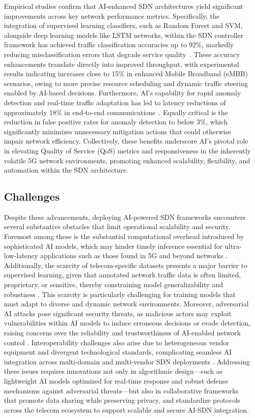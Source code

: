 \documentclass[sigconf]{acmart}
\begin{document}
Empirical studies confirm that AI-enhanced SDN architectures yield significant improvements across key network performance metrics. Specifically, the integration of supervised learning classifiers, such as Random Forest and SVM, alongside deep learning models like LSTM networks, within the SDN controller framework has achieved traffic classification accuracies up to 92\%, markedly reducing misclassification errors that degrade service quality~\cite{ref52}. These accuracy enhancements translate directly into improved throughput, with experimental results indicating increases close to 15\% in enhanced Mobile Broadband (eMBB) scenarios, owing to more precise resource scheduling and dynamic traffic steering enabled by AI-based decisions. Furthermore, AI’s capability for rapid anomaly detection and real-time traffic adaptation has led to latency reductions of approximately 18\% in end-to-end communications~\cite{ref52}. Equally critical is the reduction in false positive rates for anomaly detection to below 3\%, which significantly minimizes unnecessary mitigation actions that could otherwise impair network efficiency. Collectively, these benefits underscore AI’s pivotal role in elevating Quality of Service (QoS) metrics and responsiveness in the inherently volatile 5G network environments, promoting enhanced scalability, flexibility, and automation within the SDN architecture.

\subsection{Challenges}

Despite these advancements, deploying AI-powered SDN frameworks encounters several substantive obstacles that limit operational scalability and security. Foremost among these is the substantial computational overhead introduced by sophisticated AI models, which may hinder timely inference essential for ultra-low-latency applications such as those found in 5G and beyond networks \cite{ref52}. Additionally, the scarcity of telecom-specific datasets presents a major barrier to supervised learning, given that annotated network traffic data is often limited, proprietary, or sensitive, thereby constraining model generalizability and robustness \cite{ref7}. This scarcity is particularly challenging for training models that must adapt to diverse and dynamic network environments. Moreover, adversarial AI attacks pose significant security threats, as malicious actors may exploit vulnerabilities within AI models to induce erroneous decisions or evade detection, raising concerns over the reliability and trustworthiness of AI-enabled network control \cite{ref48}. Interoperability challenges also arise due to heterogeneous vendor equipment and divergent technological standards, complicating seamless AI integration across multi-domain and multi-vendor SDN deployments \cite{ref7}. Addressing these issues requires innovations not only in algorithmic design—such as lightweight AI models optimized for real-time response and robust defense mechanisms against adversarial threats—but also in collaborative frameworks that promote data sharing while preserving privacy, and standardize protocols across the telecom ecosystem to support scalable and secure AI-SDN integration.
\end{document}
